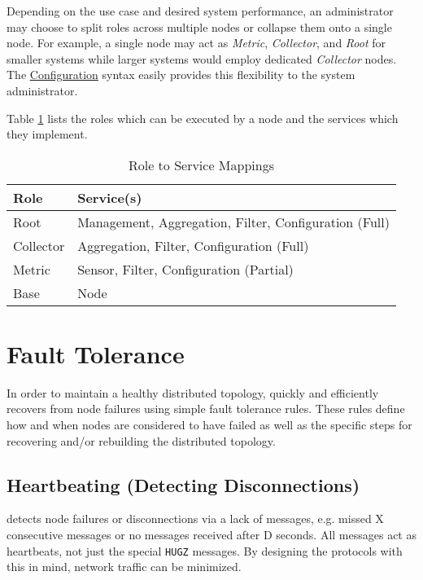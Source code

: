 Depending on the use case and desired system performance, an administrator may choose to split roles across multiple
nodes or collapse them onto a single node. For example, a single node may act as \textit{Metric}, \textit{Collector},
and \textit{Root} for smaller systems while larger systems would employ dedicated \textit{Collector} nodes. The \dcamp
\hyperref[configuration]{Configuration} syntax easily provides this flexibility to the system administrator.

Table \ref{tab:role_to_services} lists the roles which can be executed by a \dcamp node and the services which they
implement.

\begin{table}
\begin{tabular}{l l}

\hline
\textbf{Role} & \textbf{Service(s)} \\
\hline

Root & Management, Aggregation, Filter, Configuration (Full) \\

Collector & Aggregation, Filter, Configuration (Full) \\

Metric & Sensor, Filter, Configuration (Partial) \\

Base & Node \\

\end{tabular}
\caption{Role to Service Mappings}
\label{tab:role_to_services}
\end{table}

\section{Fault Tolerance}

In order to maintain a healthy distributed topology, \dcamp quickly and efficiently recovers from node failures using
simple fault tolerance rules. These rules define how and when nodes are considered to have failed as well as the
specific steps for recovering and/or rebuilding the distributed topology.

\subsection{Heartbeating (Detecting Disconnections)}

\dcamp detects node failures or disconnections via a lack of messages, e.g. missed X consecutive messages or no messages
received after D seconds. All messages act as heartbeats, not just the special \texttt{HUGZ} messages. By designing the
protocols with this in mind, network traffic can be minimized.

